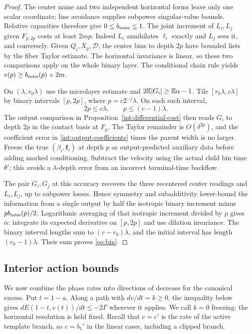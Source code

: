\begin{proof}
The center name and two independent horizontal
forms leave only one scalar coordinate; line
avoidance supplies subpower singular-value
bounds. Relative capacities therefore give
$0\leq b_{\rm miss}\leq1$. The joint
increment of $L_i,L_j$ given $F_{p,2p}$
costs at least $2mp$. Indeed $L_i$
annihilates $\ell_i$ exactly and $L_j$
sees it, and conversely. Given
$Q_i,X_p,\mathcal D$, the center bins
to depth $2p$ have bounded lists by
the fiber Taylor estimate. The
horizontal invariance is linear,
so these two comparisons apply
on the whole binary layer. The
conditional chain rule yields
$e(p)\geq b_{\rm miss}(p)+2m$.

On $(\lambda,r_0\lambda)$ use the
microlayer estimate and
$2\mathbb E|G_i|\geq\mathbb E\alpha-1$.
Tile $[r_0\lambda,c\lambda]$ by
binary intervals $[p,2p]$, where
$p=c2^{-j}\lambda$. On each such
interval,
\[
 2p\leq c\lambda,\qquad
 p\leq(c-1)\lambda.
\]
The output comparison in
Proposition~\ref{int:differential-cost}
then reads $G_i$ to depth $2p$
in the contact basis at $F_p$.
The Taylor remainder is
$O(\delta^{2p})$, and the coefficient
error in \eqref{int:output-coefficients}
times the parent width is no larger.
Freeze the true $(\beta_i,\mathfrak k_i)$
at depth $p$ as output-predicted
auxiliary data before adding marked
conditioning. Subtract the velocity
using the actual child bin time
$\theta'$; this avoids a
$\lambda$-depth error from an
incorrect terminal-time backflow.

The pair $G_i,G_j$ at this accuracy
recovers the three recentered center
readings and $L_i,L_j$, up to
subpower losses. Hence symmetry and
subadditivity lower-bound the
information from a single output
by half the isotropic binary
increment minus $pb_{\rm miss}(p)/2$.
Logarithmic averaging of that
isotropic increment divided by $p$
gives $\bar\alpha$: integrate its
expected derivative on $[p,2p]$
and use dilation invariance.
The binary interval lengths sum
to $(c-r_0)\lambda$, and the
initial interval has length
$(r_0-1)\lambda$. Their sum proves
\eqref{eq:bin}.
\end{proof}

\subsection{Interior action bounds}

We now combine the phase rates into directions of decrease for
the canonical excess. Put $t=1-a$. Along a path with
$dv/dt=k\ge0$, the inequality below gives
$dE(1-t,v(t))/dt\le-2\Gamma$ wherever it applies.
We call $k=0$ freezing: the horizontal resolution is held fixed.
Recall that $c=c'$ is the rate of the active template branch,
so $c=b_1'$ in the linear cases, including a clipped branch.

